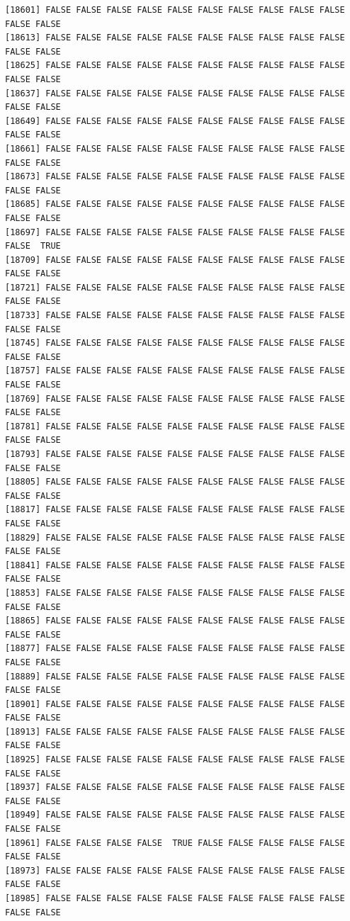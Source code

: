 \documentclass[
  a4paper,
  DIV=11,
  numbers=noendperiod]{scrartcl}
\begin{document}
\begin{verbatim}
[18601] FALSE FALSE FALSE FALSE FALSE FALSE FALSE FALSE FALSE FALSE FALSE FALSE
[18613] FALSE FALSE FALSE FALSE FALSE FALSE FALSE FALSE FALSE FALSE FALSE FALSE
[18625] FALSE FALSE FALSE FALSE FALSE FALSE FALSE FALSE FALSE FALSE FALSE FALSE
[18637] FALSE FALSE FALSE FALSE FALSE FALSE FALSE FALSE FALSE FALSE FALSE FALSE
[18649] FALSE FALSE FALSE FALSE FALSE FALSE FALSE FALSE FALSE FALSE FALSE FALSE
[18661] FALSE FALSE FALSE FALSE FALSE FALSE FALSE FALSE FALSE FALSE FALSE FALSE
[18673] FALSE FALSE FALSE FALSE FALSE FALSE FALSE FALSE FALSE FALSE FALSE FALSE
[18685] FALSE FALSE FALSE FALSE FALSE FALSE FALSE FALSE FALSE FALSE FALSE FALSE
[18697] FALSE FALSE FALSE FALSE FALSE FALSE FALSE FALSE FALSE FALSE FALSE  TRUE
[18709] FALSE FALSE FALSE FALSE FALSE FALSE FALSE FALSE FALSE FALSE FALSE FALSE
[18721] FALSE FALSE FALSE FALSE FALSE FALSE FALSE FALSE FALSE FALSE FALSE FALSE
[18733] FALSE FALSE FALSE FALSE FALSE FALSE FALSE FALSE FALSE FALSE FALSE FALSE
[18745] FALSE FALSE FALSE FALSE FALSE FALSE FALSE FALSE FALSE FALSE FALSE FALSE
[18757] FALSE FALSE FALSE FALSE FALSE FALSE FALSE FALSE FALSE FALSE FALSE FALSE
[18769] FALSE FALSE FALSE FALSE FALSE FALSE FALSE FALSE FALSE FALSE FALSE FALSE
[18781] FALSE FALSE FALSE FALSE FALSE FALSE FALSE FALSE FALSE FALSE FALSE FALSE
[18793] FALSE FALSE FALSE FALSE FALSE FALSE FALSE FALSE FALSE FALSE FALSE FALSE
[18805] FALSE FALSE FALSE FALSE FALSE FALSE FALSE FALSE FALSE FALSE FALSE FALSE
[18817] FALSE FALSE FALSE FALSE FALSE FALSE FALSE FALSE FALSE FALSE FALSE FALSE
[18829] FALSE FALSE FALSE FALSE FALSE FALSE FALSE FALSE FALSE FALSE FALSE FALSE
[18841] FALSE FALSE FALSE FALSE FALSE FALSE FALSE FALSE FALSE FALSE FALSE FALSE
[18853] FALSE FALSE FALSE FALSE FALSE FALSE FALSE FALSE FALSE FALSE FALSE FALSE
[18865] FALSE FALSE FALSE FALSE FALSE FALSE FALSE FALSE FALSE FALSE FALSE FALSE
[18877] FALSE FALSE FALSE FALSE FALSE FALSE FALSE FALSE FALSE FALSE FALSE FALSE
[18889] FALSE FALSE FALSE FALSE FALSE FALSE FALSE FALSE FALSE FALSE FALSE FALSE
[18901] FALSE FALSE FALSE FALSE FALSE FALSE FALSE FALSE FALSE FALSE FALSE FALSE
[18913] FALSE FALSE FALSE FALSE FALSE FALSE FALSE FALSE FALSE FALSE FALSE FALSE
[18925] FALSE FALSE FALSE FALSE FALSE FALSE FALSE FALSE FALSE FALSE FALSE FALSE
[18937] FALSE FALSE FALSE FALSE FALSE FALSE FALSE FALSE FALSE FALSE FALSE FALSE
[18949] FALSE FALSE FALSE FALSE FALSE FALSE FALSE FALSE FALSE FALSE FALSE FALSE
[18961] FALSE FALSE FALSE FALSE  TRUE FALSE FALSE FALSE FALSE FALSE FALSE FALSE
[18973] FALSE FALSE FALSE FALSE FALSE FALSE FALSE FALSE FALSE FALSE FALSE FALSE
[18985] FALSE FALSE FALSE FALSE FALSE FALSE FALSE FALSE FALSE FALSE FALSE FALSE

\end{verbatim}
\end{document}
